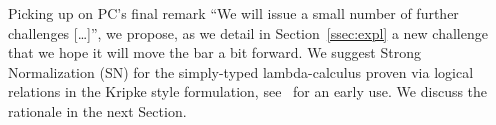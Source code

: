 Picking up on PC's final remark ``We will issue a small number of further
challenges [\dots]'', we propose, as we detail in
Section~\ref{ssec:expl} a new challenge that we hope it will move the
bar a bit forward. We suggest Strong Normalization (SN) for the
simply-typed lambda-calculus proven via logical relations in the
Kripke style formulation, see~\citep{Coquand91} for an early use. We
discuss the rationale in the next Section.


